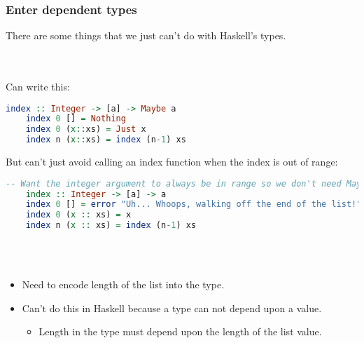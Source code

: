 \documentclass{beamer}
\begin{document}
\begin{frame}[fragile]
  \frametitle{Enter dependent types}

  There are some things that we just can't do with Haskell's types.

  \pause \\~\\

  Can write this:

  \begin{lstlisting}[frame=single, language=Haskell, breaklines=true, basicstyle=\ttfamily\tiny]
    index :: Integer -> [a] -> Maybe a
    index 0 [] = Nothing
    index 0 (x::xs) = Just x
    index n (x::xs) = index (n-1) xs
  \end{lstlisting}

  \pause
  But can't just avoid calling an index function when the index is out of range:

  \begin{lstlisting}[frame=single, language=Haskell, breaklines=true, basicstyle=\ttfamily\tiny]
    -- Want the integer argument to always be in range so we don't need Maybe!
    index :: Integer -> [a] -> a
    index 0 [] = error "Uh... Whoops, walking off the end of the list!"
    index 0 (x :: xs) = x
    index n (x :: xs) = index (n-1) xs
  \end{lstlisting}

  \pause \\~\\

  \begin{itemize}
  \item Need to encode length of the list into the type.
  \item Can't do this in Haskell because a type can not depend upon a value.
    \begin{itemize}
    \item Length in the type must depend upon the length of the list value.
    \end{itemize}
  \end{itemize}
\end{frame}
\end{document}

